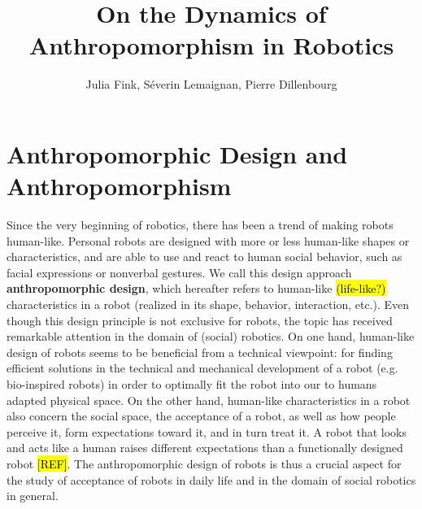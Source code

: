 \documentclass[lettersize, apacite, twoside, HRI]{apa_HRI}
\title{On the Dynamics of Anthropomorphism in Robotics
}
\author{Julia Fink, Séverin Lemaignan, Pierre Dillenbourg}
\affiliation{ Computer-Human Interaction in Learning and Instruction (CHILI) \\
              Ecole Polytechnique Fédérale de Lausanne (EPFL) \\
              CH-1015 Lausanne, Switzerland
}
\begin{document}
\maketitle


%
%
%
%
%
%


\section{Anthropomorphic Design and Anthropomorphism}
\label{sec:intro}

	 Since the very beginning of robotics, there has been a trend of making robots human-like. Personal robots are designed with more or less human-like shapes or characteristics, and are able to use and react to human social behavior, such as facial expressions or nonverbal gestures. We call this design approach \textbf{anthropomorphic design}, which hereafter refers to human-like \hl{(life-like?)} characteristics in a robot (realized in its shape, behavior, interaction, etc.). Even though this design principle is not exclusive for robots, the topic has received remarkable attention in the domain of (social) robotics. On one hand, human-like design of robots seems to be beneficial from a technical viewpoint: for finding efficient solutions in the technical and mechanical development of a robot (e.g. bio-inspired robots) in order to optimally fit the robot into our to humans adapted physical space. On the other hand, human-like characteristics in a robot also concern the social space, the acceptance of a robot, as well as how people perceive it, form expectations toward it, and in turn treat it. A robot that looks and acts like a human raises different expectations than a functionally designed robot \hl{[REF]}. The anthropomorphic design of robots is thus a crucial aspect for the study of acceptance of robots in daily life and in the domain of social robotics in general. 
	
\end{document}
